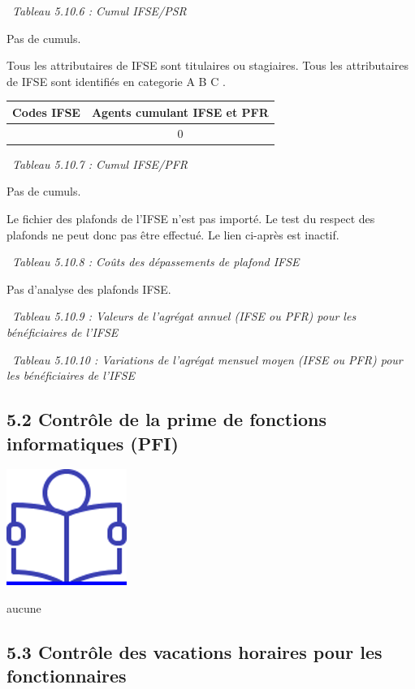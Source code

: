 ~\emph{Tableau 5.10.6 : Cumul IFSE/PSR}

Pas de cumuls.

Tous les attributaires de IFSE sont titulaires ou stagiaires. Tous les
attributaires de IFSE sont identifiés en categorie A B C .

\begin{longtable}[]{@{}cc@{}}
\toprule
Codes IFSE & Agents cumulant IFSE et PFR\tabularnewline
\midrule
\endhead
& 0\tabularnewline
\bottomrule
\end{longtable}

~\emph{Tableau 5.10.7 : Cumul IFSE/PFR}

Pas de cumuls.

Le fichier des plafonds de l'IFSE n'est pas importé. Le test du respect
des plafonds ne peut donc pas être effectué. Le lien ci-après est
inactif.

~\emph{Tableau 5.10.8 : Coûts des dépassements de plafond IFSE}

Pas d'analyse des plafonds IFSE.

~\emph{Tableau 5.10.9 : Valeurs de l'agrégat annuel (IFSE ou PFR) pour
les bénéficiaires de l'IFSE}

~\emph{Tableau 5.10.10 : Variations de l'agrégat mensuel moyen (IFSE ou
PFR) pour les bénéficiaires de l'IFSE}

\hypertarget{controle-de-la-prime-de-fonctions-informatiques-pfi}{%
\subsection{5.2 Contrôle de la prime de fonctions informatiques
(PFI)}\label{controle-de-la-prime-de-fonctions-informatiques-pfi}}

\href{../Docs/Notices/fiche_PFI.odt}{\includegraphics{icones/Notice.png}}

aucune

\hypertarget{controle-des-vacations-horaires-pour-les-fonctionnaires}{%
\subsection{5.3 Contrôle des vacations horaires pour les
fonctionnaires}\label{controle-des-vacations-horaires-pour-les-fonctionnaires}}

